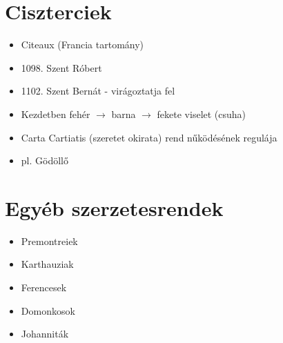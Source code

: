 \documentclass{article}
\begin{document}
\section{Ciszterciek}
\begin{itemize}
    \item Citeaux (Francia tartomány)
     \item 1098. Szent Róbert
     \item 1102. Szent Bernát - virágoztatja fel
     \item Kezdetben fehér $\rightarrow$ barna $\rightarrow$ fekete viselet (csuha)
     \item Carta Cartiatis (szeretet okirata) rend nűködésének regulája
     \item pl. Gödöllő
\end{itemize}

\section{Egyéb szerzetesrendek}
\begin{itemize}
    \item Premontreiek
    \item Karthauziak
    \item Ferencesek
    \item Domonkosok
    \item Johanniták
\end{itemize}
\end{document}
